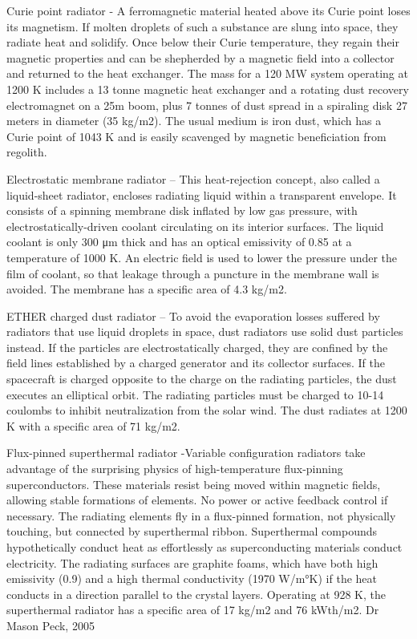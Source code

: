 \documentclass[a4paper]{book}
\begin{document}
Curie point radiator  - A ferromagnetic material heated above its Curie point loses its magnetism.  If molten droplets of such a substance are slung into space, they radiate heat and solidify. Once below their Curie temperature, they regain their magnetic properties and can be shepherded by a magnetic field into a collector and returned to the heat exchanger.  The mass for a 120 MW system operating at 1200 K includes a 13 tonne magnetic heat exchanger and a rotating dust recovery electromagnet on a 25m boom, plus 7 tonnes of dust spread in a spiraling disk 27 meters in diameter (35 kg/m2). The usual medium is iron dust, which has a Curie point of 1043 K and is easily scavenged by magnetic beneficiation from regolith.
 
Electrostatic membrane radiator – This heat-rejection concept, also called a liquid-sheet radiator, encloses radiating liquid within a transparent envelope. It consists of a spinning membrane disk inflated by low gas pressure, with electrostatically-driven coolant circulating on its interior surfaces. The liquid coolant is only 300 μm thick and has an optical emissivity of 0.85 at a temperature of 1000 K. An electric field is used to lower the pressure under the film of coolant, so that leakage through a puncture in the membrane wall is avoided.  The membrane has a specific area of 4.3 kg/m2.
 
ETHER charged dust radiator –  To avoid the evaporation losses suffered by radiators that use liquid droplets in space, dust radiators use solid dust particles instead. If the particles are electrostatically charged, they are confined by the field lines established by a charged generator and its collector surfaces. If the spacecraft is charged opposite to the charge on the radiating particles, the dust executes an elliptical orbit.  The radiating particles must be charged to 10-14 coulombs to inhibit neutralization from the solar wind.  The dust radiates at 1200 K with a specific area of 71 kg/m2.

Flux-pinned superthermal radiator -Variable configuration radiators take advantage of the surprising physics of high-temperature flux-pinning superconductors. These materials resist being moved within magnetic fields, allowing stable formations of elements. No power or active feedback control if necessary. The radiating elements fly in a flux-pinned formation, not physically touching, but connected by superthermal ribbon. Superthermal compounds hypothetically conduct heat as effortlessly as superconducting materials conduct electricity. The radiating surfaces are graphite foams, which have both high emissivity (0.9) and a high thermal conductivity (1970 W/m°K) if the heat conducts in a direction parallel to the crystal layers. Operating at 928 K, the superthermal radiator has a specific area of 17 kg/m2 and 76 kWth/m2. Dr Mason Peck, 2005
 
\end{document}
